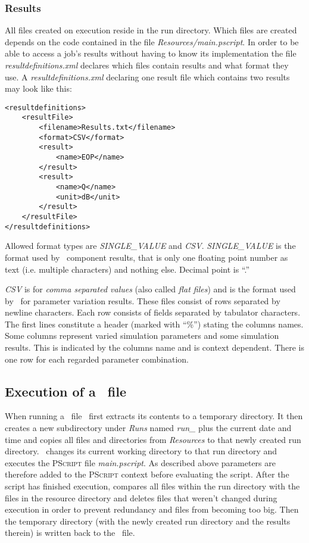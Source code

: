 \subsubsection{Results}
\label{pjob:results}
All files created on execution reside in the run directory.
Which files are created depends on the code contained in the file \textit{Resources/main.pscript}.
In order to be able to access a job's results without having to know its implementation
the file \textit{resultdefinitions.xml} declares which files contain results
and what format they use.
A \textit{resultdefinitions.xml} declaring one result file which contains two results may look like this:
\lstset{language=XML}
\begin{lstlisting}
<resultdefinitions>
	<resultFile>
		<filename>Results.txt</filename>
		<format>CSV</format>
		<result>
			<name>EOP</name>
		</result>
		<result>
			<name>Q</name>
			<unit>dB</unit>
		</result>
	</resultFile>
</resultdefinitions>
\end{lstlisting}
Allowed format types are \textit{SINGLE\_VALUE} and \textit{CSV}.
\textit{SINGLE\_VALUE} is the format used by \PHO\ component results,
that is only one floating point number as text (i.e. multiple characters)
and nothing else.
Decimal point is ``.''

\textit{CSV} is for \textit{comma separated values} (also called \textit{flat files}) and is the format used by \PHO\ for parameter variation results.
These files consist of rows separated by newline characters.
Each row consists of fields separated by tabulator characters.
The first lines constitute a header (marked with ``\%'') stating the columns names.
Some columns represent varied simulation parameters and some simulation results.
This is indicated by the columns name and is context dependent.
There is one row for each regarded parameter combination.



\subsection{Execution of a \pjob\ file}
When running a \pjob\ file \photoss\ first extracts its contents to a temporary directory.
It then creates a new subdirectory under \textit{Runs}
named \textit{run\_} plus the current date and time
and copies all files and directories from \textit{Resources} to that newly created run directory.
\photoss\ changes its current working directory to that run directory and
executes the \textsc{PScript} file \textit{main.pscript}.
As described above parameters are therefore added to the \textsc{PScript} context before evaluating the script.
After the script has finished execution,
\PHO{} compares all files within the run directory with the files in the resource directory and deletes files
that weren't changed during execution in order to prevent redundancy and \PJOB{} files from becoming too big.
Then the temporary directory
(with the newly created run directory and the results therein)
is written back to the \pjob\ file.


